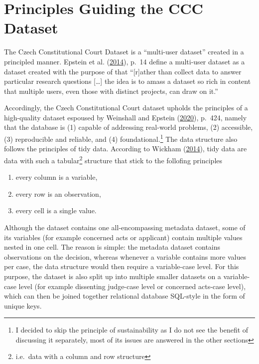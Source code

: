 \documentclass[
  11pt,
]{article}
\providecommand{\tightlist}{%
  \setlength{\itemsep}{0pt}\setlength{\parskip}{0pt}}
\begin{document}
\hypertarget{principles-guiding-the-ccc-dataset}{%
\section{Principles Guiding the CCC
Dataset}\label{principles-guiding-the-ccc-dataset}}

The Czech Constitutional Court Dataset is a ``multi-user dataset''
created in a principled manner. Epstein et al.
(\protect\hyperlink{ref-epsteinIntroductionEmpiricalLegal2014}{2014}),
p.~14 define a multi-user dataset as a dataset created with the purpose
of that ``{[}r{]}ather than collect data to answer particular research
questions {[}\ldots{]} the idea is to amass a dataset so rich in content
that multiple users, even those with distinct projects, can draw on
it.''

Accordingly, the Czech Constitutional Court dataset upholds the
principles of a high-quality dataset espoused by Weinshall and Epstein
(\protect\hyperlink{ref-weinshallDevelopingHighQualityData2020}{2020}),
p.~424, namely that the database is (1) capable of addressing real-world
problems, (2) accessible, (3) reproducible and reliable, and (4)
foundational.\footnote{I decided to skip the principle of sustainability
  as I do not see the benefit of discussing it separately, most of its
  issues are answered in the other sections} The data structure also
follows the principles of tidy data. According to Wickham
(\protect\hyperlink{ref-wickhamTidyData2014}{2014}), tidy data are data
with such a tabular\footnote{i.e.~data with a column and row structure}
structure that stick to the follofing principles

\begin{enumerate}
\def\labelenumi{(\arabic{enumi})}
\tightlist
\item
  every column is a variable,
\item
  every row is an observation,
\item
  every cell is a single value.
\end{enumerate}

Although the dataset contains one all-encompassing metadata dataset,
some of its variables (for example concerned acts or applicant) contain
multiple values nested in one cell. The reason is simple: the metadata
dataset contains observations on the decision, whereas whenever a
variable contains more values per case, the data structure would then
require a variable-case level. For this purpose, the dataset is also
split up into multiple smaller datasets on a variable-case level (for
example dissenting judge-case level or concerned acts-case level), which
can then be joined together relational database SQL-style in the form of
unique keys.
\end{document}
